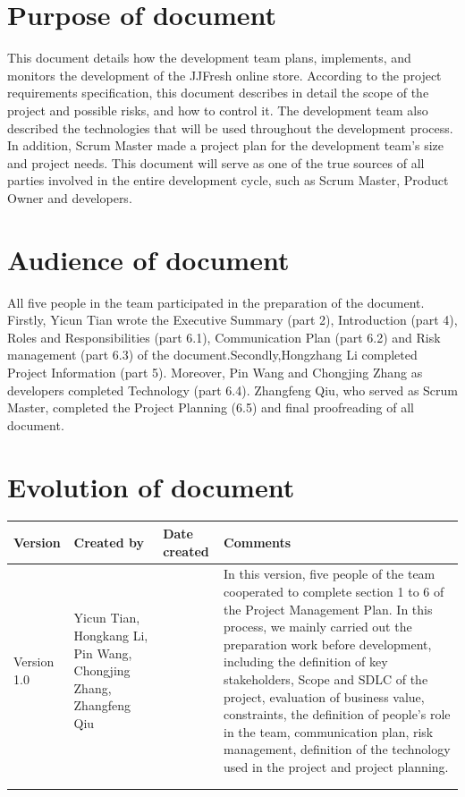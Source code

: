 \documentclass{report}
\begin{document}
\section{Purpose of document}
   This document details how the development team plans, implements, and monitors the development of the JJFresh online store. According to the project requirements specification, this document describes in detail the scope of the project and possible risks, and how to control it. The development team also described the technologies that will be used throughout the development process. In addition, Scrum Master made a project plan for the development team's size and project needs. This document will serve as one of the true sources of all parties involved in the entire development cycle, such as Scrum Master, Product Owner and developers.

\section{Audience of document}
   All five people in the team participated in the preparation of the document. Firstly, Yicun Tian wrote the Executive Summary (part 2), Introduction (part 4), Roles and Responsibilities (part 6.1), Communication Plan (part 6.2) and Risk management (part 6.3) of the document.Secondly,Hongzhang Li completed Project Information (part 5). Moreover, Pin Wang and Chongjing Zhang as developers completed Technology (part 6.4). Zhangfeng Qiu, who served as Scrum Master, completed the Project Planning (6.5) and final proofreading of all document.

\section{Evolution of document}
\begin{tabularx}{0.95\linewidth}{%
  l%
  >{\raggedright\arraybackslash}p{2.2cm}%
  >{\raggedright\arraybackslash}p{1.5cm}%
  >{\raggedright\arraybackslash}X}
  \toprule
  Version & Created by & Date created & Comments\\
  \midrule
  Version 1.0
  & Yicun Tian, Hongkang Li, Pin Wang, Chongjing Zhang, Zhangfeng Qiu
  & 4.27
  & In this version, five people of the team cooperated to complete section 1 to 6 of the Project Management Plan. In this process, we mainly carried out the preparation work before development, including the definition of key stakeholders, Scope and SDLC of the project, evaluation of business value, constraints, the definition of people's role in the team, communication plan, risk management, definition of the technology used in the project and project planning.
  \\
  \bottomrule
  \\
  \caption{Evolution of document}  
  \label{tab:evolutionOfDocument}
\end{tabularx}
\end{document}
